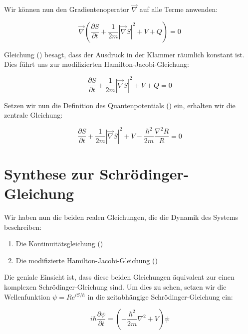 Wir können nun den Gradientenoperator $\vec{\nabla}$ auf alle Terme anwenden:

\begin{equation}
    \label{eq:zwischenstand}
    \vec{\nabla} \left( \frac{\partial S}{\partial t} + \frac{1}{2m} \left| \vec{\nabla} S \right|^2 + V + Q \right) = 0
\end{equation}

Gleichung () besagt, dass der Ausdruck in der Klammer räumlich konstant ist. Dies führt uns zur modifizierten Hamilton-Jacobi-Gleichung:

\begin{equation}
    \frac{\partial S}{\partial t} + \frac{1}{2m} \left| \vec{\nabla} S \right|^2 + V + Q = 0
\end{equation}

Setzen wir nun die Definition des Quantenpotentials () ein, erhalten wir die zentrale Gleichung:

\begin{equation}
    \label{eq:modifizierte_hamilton_jacobi}
    \frac{\partial S}{\partial t} + \frac{1}{2m} \left| \vec{\nabla} S \right|^2 + V - \frac{\hbar^2}{2m} \frac{\nabla^2 R}{R} = 0
\end{equation}

\section{Synthese zur Schrödinger-Gleichung}
\label{sec:schrödinger_gleichung}
Wir haben nun die beiden realen Gleichungen, die die Dynamik des Systems beschreiben:

\begin{enumerate}
    \item Die Kontinuitätsgleichung ()
    \item Die modifizierte Hamilton-Jacobi-Gleichung ()
\end{enumerate}

Die geniale Einsicht ist, dass diese beiden Gleichungen äquivalent zur einen komplexen Schrödinger-Gleichung sind. Um dies zu sehen, setzen wir die Wellenfunktion $\psi = R e^{iS/\hbar}$
in die zeitabhängige Schrödinger-Gleichung ein:

\begin{equation}
    \label{eq:schrödinger_gleichung}
    i\hbar \frac{\partial \psi}{\partial t} = \left( -\frac{\hbar^2}{2m} \nabla^2 + V \right) \psi
\end{equation}


